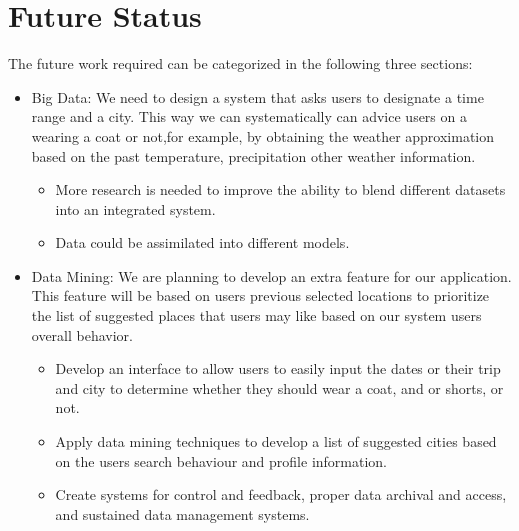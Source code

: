 \documentclass{sig-alternate}
\begin{document}
\section{Future Status}
\label{Future status}
The future work required can be categorized in the following three sections:

\begin{itemize}

	\item Big Data:\newline
	We need to design a system that asks users to designate a time range and a city. This 		way we can systematically can advice users on a wearing a coat or not,for example, by 		obtaining the weather approximation based on the past temperature, precipitation other
 	weather information.
 \newline
	
	\begin{itemize}
		\item 
		More research is needed to improve the ability to blend different datasets into an 		integrated system.
		
		\item 
		Data could be assimilated into different models.
	\end{itemize}
	
	\item Data Mining:\newline
	We are planning to develop an extra feature for our application. This feature will be 		based on users previous selected locations to prioritize the list of suggested places 		that users may like based on our system users overall behavior.

	\begin{itemize}
		\item 
		Develop an interface to allow users to easily input the dates or their trip and 	  		city to determine whether they should wear a coat, and or shorts, or not.
		
		\item 
		Apply data mining techniques to develop a list of suggested cities based on the 				users search behaviour and profile information.
		
		\item 
		Create systems for control and feedback, proper data archival and access, and 				sustained data management systems.
	\end{itemize}
	
\end{itemize}
\end{document}
